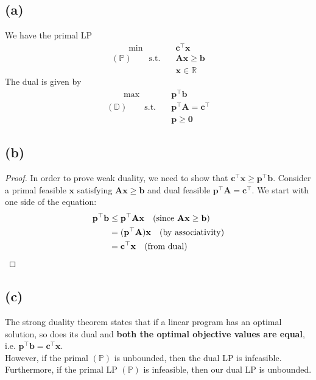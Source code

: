 \documentclass[12pt]{article}
\begin{document}
\subsection*{(a)}
We have the primal LP \begin{align*}
    \qquad \min \quad & \mathbf{c}^{\top}\mathbf{x} \\ 
    (\mathbb{P}) \qquad \text{s.t.} \quad & \mathbf{Ax} \geq \mathbf{b} \\ 
    & \mathbf{x} \in \mathbb{R}
\end{align*} The dual is given by \begin{align*}
    \qquad \max \quad & \mathbf{p}^{\top}\mathbf{b} \\ 
    (\mathbb{D}) \qquad \text{s.t.} \quad & \mathbf{p}^{\top}\mathbf{A} = \mathbf{c}^{\top} \\
    & \mathbf{p} \geq \mathbf{0}
\end{align*}

\subsection*{(b)}
\begin{proof}
    In order to prove weak duality, we need to show that $\mathbf{c}^{\top}\mathbf{x} \geq \mathbf{p}^{\top}\mathbf{b}$. Consider a primal feasible $\mathbf{x}$ satisfying $\mathbf{Ax} \geq \mathbf{b}$ and dual feasible $\mathbf{p}^{\top}\mathbf{A} = \mathbf{c}^{\top}$. We start with one side of the equation: \begin{align*}
        \mathbf{p}^{\top}\mathbf{b} &\leq \mathbf{p}^{\top}\mathbf{Ax} \quad \text{(since } \mathbf{Ax} \geq \mathbf{b}) \\ 
        &= (\mathbf{p}^{\top}\mathbf{A})\mathbf{x} \quad \text{(by associativity)} \\ 
        &= \mathbf{c}^{\top}\mathbf{x} \quad \text{(from dual)} \qedhere
    \end{align*} 
\end{proof}

\subsection*{(c)}
The strong duality theorem states that if a linear program has an optimal solution, so does its dual and \textbf{both the optimal objective values are equal}, i.e. $\mathbf{p}^{\top}\mathbf{b} = \mathbf{c}^{\top}\mathbf{x}$. \\ 

\noindent However, if the primal $(\mathbb{P})$ is unbounded, then the dual LP is infeasible. Furthermore, if the primal LP $(\mathbb{P})$ is infeasible, then our dual LP is unbounded. 
\end{document}
